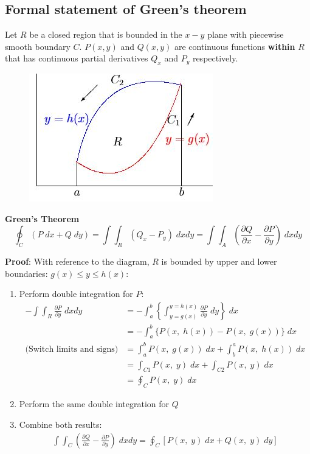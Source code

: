 \documentclass[10pt,a4paper]{article}
\begin{document}
\subsection{Formal statement of Green's theorem}

Let $R$ be a closed region that is bounded in the $x-y$ plane with piecewise
smooth boundary $C$. $P(x,y)$ and $Q(x,y)$ are continuous functions \textbf{within} $R$ that has continuous
partial derivatives $Q_x$ and $P_y$ respectively.

\begin{figure}[h]
    \centering
    \includegraphics[]{Greens.JPG}
\end{figure}

\begin{tcolorbox}[breakable,colback=white]
\textbf{Green's Theorem}
$$
    \oint_C (P\;dx + Q \; dy) = \int \int_R (Q_x - P_y)\;dxdy = \int\int_A \left(\frac{\partial Q}{\partial x}-\frac{\partial P}{\partial y}\right)\; dxdy 
$$
\end{tcolorbox}

\textbf{Proof}: With reference to the diagram, $R$ is bounded by upper and lower boundaries:
$g(x)\leq y \leq h(x)$:
\begin{enumerate}
    \item Perform double integration for $P$:
    \begin{align*}
        -\int \int_R \frac{\partial P}{\partial y}\; dxdy &= -\int_a^b \left\{\int_{y=g(x)}^{y=h(x)}\frac{\partial P}{\partial y}\; dy\right\}\; dx \\
        &= -\int_a^b \{P(x,\; h(x)) - P(x,\; g(x))\}\; dx \\ 
        \text{(Switch limits and signs)} &= \int_a^b P(x,\; g(x))\; dx + \int_b^a P(x,\; h(x))\;dx \\
        &= \int_{C1}P(x,\; y)\; dx + \int_{C2}P(x,\; y)\; dx \\
        &= \oint_C P(x,\; y) \; dx 
    \end{align*}

    \item Perform the same double integration for $Q$
    \item Combine both results:
    \begin{align*}
        \int \int_C \left(\frac{\partial Q}{\partial x} - \frac{\partial P}{\partial y}\right)\; dxdy = \oint_C [P(x,\;y)\; dx + Q(x,\; y)\; dy]
    \end{align*}
\end{enumerate}
\end{document}
